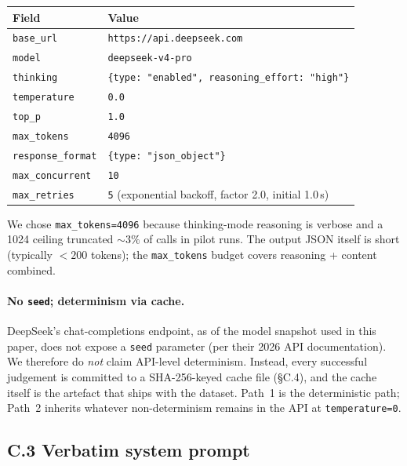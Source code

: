\begin{center}
\small
\begin{tabular}{@{}l l@{}}
\toprule
\textbf{Field} & \textbf{Value} \\
\midrule
\texttt{base\_url}        & \texttt{https://api.deepseek.com} \\
\texttt{model}            & \texttt{deepseek-v4-pro} \\
\texttt{thinking}         & \texttt{\{type: "enabled", reasoning\_effort: "high"\}} \\
\texttt{temperature}      & \texttt{0.0} \\
\texttt{top\_p}           & \texttt{1.0} \\
\texttt{max\_tokens}      & \texttt{4096} \\
\texttt{response\_format} & \texttt{\{type: "json\_object"\}} \\
\texttt{max\_concurrent}  & \texttt{10} \\
\texttt{max\_retries}     & \texttt{5} (exponential backoff, factor 2.0, initial 1.0\,s) \\
\bottomrule
\end{tabular}
\end{center}

\noindent We chose \texttt{max\_tokens=4096} because thinking-mode reasoning is verbose and a 1024 ceiling truncated $\sim 3\%$ of calls in pilot runs. The output JSON itself is short (typically $< 200$ tokens); the \texttt{max\_tokens} budget covers reasoning + content combined.

\paragraph{No \texttt{seed}; determinism via cache.}
DeepSeek's chat-completions endpoint, as of the model snapshot used in this paper, does not expose a \texttt{seed} parameter (per their 2026 API documentation). We therefore do \emph{not} claim API-level determinism. Instead, every successful judgement is committed to a SHA-256-keyed cache file (\S C.4), and the cache itself is the artefact that ships with the dataset. Path~1 is the deterministic path; Path~2 inherits whatever non-determinism remains in the API at \texttt{temperature=0}.

\subsection*{C.3 \quad Verbatim system prompt}


